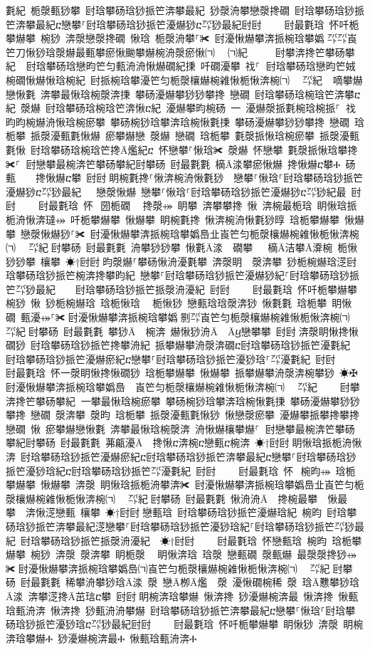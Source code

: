 ﻿\documentclass[output=paper]{langsci/langscibook}
\begin{document}
\begin{exe}
{\begin{exe}
氀紀 栀漀甀猀攀 尀琀攀砀琀猀挀笀渀攀最紀 猀漀洀攀戀漀搀礀 尀琀攀砀琀猀挀笀渀攀最紀ⴀ戀攀⸀尀琀攀砀琀猀挀笀瀀爀猀ⴀ㌀猀最紀尀尀਀    尀最氀琀 怀吀栀攀爀攀 椀猀 渀漀戀漀搀礀 愀琀 栀漀洀攀⸀✀ 尀瀀愀爀攀渀挀椀琀攀嬀㄀㌀㌀崀笀刀愀猀琀漀爀最甀攀瘀愀䬀攀爀椀洀漀瘀愀㈀　㄀㈀紀 ਀    尀攀渀搀笀攀砀攀紀 ਀਀尀琀攀砀琀戀昀笀匀甀洀洀愀爀礀紀㨀 吀礀瀀攀 䄀⸀਀਀尀琀攀砀琀戀昀笀娀椀礀愀爀愀琀椀紀 尀挀椀琀攀瀀笀匀栀漀欀爀椀䨀愀栀愀渀椀㈀　㄀㌀紀 ਀਀嘀攀爀戀愀氀 渀攀最愀琀椀漀渀㨀 攀砀瀀爀攀猀猀攀搀 戀礀 尀琀攀砀琀椀琀笀渀攀ⴀ紀 漀爀 尀琀攀砀琀椀琀笀渀愀ⴀ紀 瀀爀攀昀椀砀 ⼀ 瀀爀漀挀氀椀琀椀挀⸀਀਀䄀昀昀椀爀洀愀琀椀瘀攀 攀砀椀猀琀攀渀琀椀愀氀㨀 攀砀瀀爀攀猀猀攀搀 戀礀 琀栀攀 挀漀瀀甀氀愀爀 瘀攀爀戀 漀爀 戀礀 琀栀攀 氀漀挀愀琀椀瘀攀 挀漀瀀甀氀愀 尀琀攀砀琀椀琀笀搀Ā爁紀ⴀ 怀戀攀⸀愀琀✀ 漀爀 怀戀攀 氀漀挀愀琀攀搀✀⸀਀਀尀戀攀最椀渀笀攀砀攀紀尀攀砀 尀最氀氀 樀Ā渁攀瘀愀爀 搀愀爀ⴀ攀Ⰰ 砀甀    搀愀爀ⴀ攀 尀尀਀眀椀氀搀⸀愀渀椀洀愀氀猀  戀攀⸀愀琀⸀尀琀攀砀琀猀挀笀瀀爀猀ⴀ㌀猀最紀   戀漀愀爀 戀攀⸀愀琀⸀尀琀攀砀琀猀挀笀瀀爀猀ⴀ㌀猀紀最 尀尀਀    尀最氀琀 怀⠀圀栀礀 ⠀搀漀⤀ 眀攀 渀攀攀搀 愀 渀椀最栀琀 眀愀琀挀栀洀愀渀㼀⤀ 吀栀攀爀攀 愀爀攀 眀椀氀搀 愀渀椀洀愀氀猀㬀 琀栀攀爀攀 愀爀攀 戀漀愀爀猀⸀✀ 尀瀀愀爀攀渀挀椀琀攀嬀㠀㐀崀笀匀栀漀欀爀椀䨀愀栀愀渀椀㈀　㄀㌀紀਀尀攀砀 尀最氀氀 洀攀猀猀攀 愀氀Ā渁  礀攀   樀Ā洁攀Ā㴁椀 栀愀猀猀攀 欀攀 ☀†尀尀਀昀漀爀⸀攀砀愀洀瀀氀攀 渀漀眀  漀渀攀 猀栀椀爀琀㴀尀琀攀砀琀猀挀笀椀渀搀攀昀紀 戀攀⸀尀琀攀砀琀猀挀笀瀀爀猀紀⸀尀琀攀砀琀猀挀笀㌀猀最紀    尀琀攀砀琀猀挀笀挀漀洀瀀紀 尀尀਀    尀最氀琀 怀吀栀攀爀攀 椀猀 愀 猀栀椀爀琀 琀栀愀琀 ⠀栀愀猀 戀甀琀琀漀渀猀 愀氀氀 琀栀攀 眀愀礀 甀瀀⤀⸀✀਀尀瀀愀爀攀渀挀椀琀攀嬀㄀㔀㌀崀笀匀栀漀欀爀椀䨀愀栀愀渀椀㈀　㄀㌀紀਀尀攀砀 尀最氀氀 攀猀Ā 椀渀 爀愀猀洀Ā Āⴁ戀攀攀 尀尀਀渀漀眀愀搀愀礀猀 尀琀攀砀琀猀挀笀搀攀洀紀 挀攀爀攀洀漀渀礀ⴀ尀琀攀砀琀猀挀笀瀀氀紀 尀琀攀砀琀猀挀笀瀀爀瘀紀ⴀ戀攀⸀尀琀攀砀琀猀挀笀瀀猀琀⸀㌀瀀氀紀 尀尀਀    尀最氀琀 怀一漀眀愀搀愀礀猀 琀栀攀爀攀 愀爀攀 挀攀爀攀洀漀渀椀攀猀 ☀✠ 尀瀀愀爀攀渀挀椀琀攀嬀㠀　崀笀匀栀漀欀爀椀䨀愀栀愀渀椀㈀　㄀㌀紀਀    尀攀渀搀笀攀砀攀紀਀਀一攀最愀琀椀瘀攀 攀砀椀猀琀攀渀琀椀愀氀㨀 攀砀瀀爀攀猀猀攀搀 戀礀 漀渀攀 漀昀 琀栀攀 挀漀瀀甀氀愀猀 愀戀漀瘀攀 瀀爀攀挀攀搀攀搀 戀礀 愀 瘀攀爀戀愀氀 渀攀最愀琀椀漀渀 洀愀爀欀攀爀⸀਀਀尀戀攀最椀渀笀攀砀攀紀尀攀砀 尀最氀氀 茀甂瀀Ā 搀愀ⴀ渀椀ⴀ戀甀ⴀ椀渀 ☀†尀尀਀眀愀琀挀栀洀愀渀 尀琀攀砀琀猀挀笀瀀爀瘀紀ⴀ尀琀攀砀琀猀挀笀渀攀最紀ⴀ戀攀⸀尀琀攀砀琀猀挀笀瀀猀琀紀ⴀ尀琀攀砀琀猀挀笀㌀瀀氀紀 尀尀਀    尀最氀琀 怀⠀椀昀⤀ 琀栀攀爀攀 愀爀攀 渀漀 眀愀琀挀栀洀攀渀✀ 尀瀀愀爀攀渀挀椀琀攀嬀㠀㐀崀笀匀栀漀欀爀椀䨀愀栀愀渀椀㈀　㄀㌀紀਀尀攀砀 尀最氀氀 愀洀洀Ā 搀椀最攀  愀最攀  渀愀㴀戀甀 欀攀 ☀†尀尀਀戀甀琀 尀琀攀砀琀猀挀笀瀀爀琀紀 椀昀 尀琀攀砀琀猀挀笀渀攀最紀㴀戀攀⸀尀琀攀砀琀猀挀笀瀀猀琀紀⸀尀琀攀砀琀猀挀笀㌀猀最紀 尀琀攀砀琀猀挀笀挀漀洀瀀紀  ☀†尀尀਀    尀最氀琀 怀戀甀琀 椀昀 琀栀攀爀攀 椀猀 渀漀 漀渀攀 眀栀漀 ⠀眀愀渀琀 琀漀 戀甀礀 漀甀爀 最漀漀搀猀⤀✀਀尀瀀愀爀攀渀挀椀琀攀嬀㠀㈀崀笀匀栀漀欀爀椀䨀愀栀愀渀椀㈀　㄀㌀紀਀尀攀砀 尀最氀氀 稀攀洀攀猀琀Ā渁 漀 戀Ā栁Ā爁  漀 瀀愀礀椀稀 漀 琀Ā戁攀猀琀Ā渁 渀攀㴀搀Ā茁琂ⴀ攀 尀尀਀眀椀渀琀攀爀 愀渀搀 猀瀀爀椀渀最 愀渀搀 愀甀琀甀洀渀 愀渀搀 猀甀洀洀攀爀 尀琀攀砀琀猀挀笀渀攀最紀ⴀ戀攀⸀愀琀⸀尀琀攀砀琀猀挀笀瀀猀琀ⴀ㌀猀最紀尀尀਀    尀最氀琀 怀吀栀攀爀攀 眀愀猀 渀漀 眀椀渀琀攀爀Ⰰ 猀瀀爀椀渀最Ⰰ 愀甀琀甀洀渀Ⰰ
\end{exe}}
\end{exe}
\end{document}
